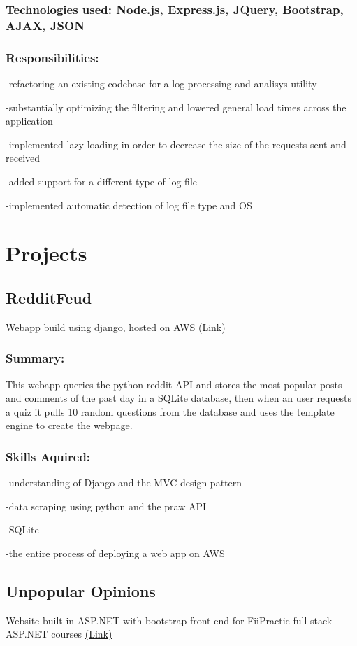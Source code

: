 \documentclass[a4paper,hidelinks,8pt]{article}
\begin{document}
\subsubsection{Technologies used: Node.js, Express.js, JQuery, Bootstrap, AJAX, JSON}
\subsubsection{Responsibilities:}
-refactoring an existing codebase for a log processing and analisys utility


-substantially optimizing the filtering and lowered general load times across the application

-implemented lazy loading in order to decrease the size of the requests sent and received

-added support for a different type of log file

-implemented automatic detection of log file type and OS

\section{Projects}
\subsection{RedditFeud}
Webapp build using django, hosted on AWS \href{https:\\www.redditfeud.com}{(Link)}
\subsubsection{Summary:}
This webapp queries the python reddit API and stores the most popular posts and comments of the past day
in a SQLite database, then when an user requests a quiz it pulls 10 random questions from the database and uses the template engine to create the webpage.
\subsubsection{Skills Aquired:}
-understanding of Django and the MVC design pattern

-data scraping using python and the praw API

-SQLite

-the entire process of deploying a web app on AWS

\subsection{Unpopular Opinions}
Website built in ASP.NET with bootstrap front end for FiiPractic full-stack ASP.NET courses \href{https://github.com/IureaMarius/UnpopularOpinions}{(Link)}
\end{document}
